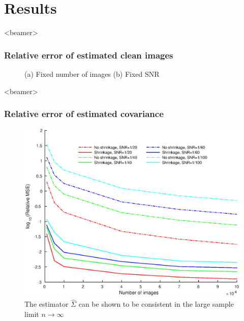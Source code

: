 \documentclass{beamer}
\begin{document}
\section{Results}
\begin{frame}<beamer>
\frametitle{Relative error of estimated clean images}

\begin{figure}[]
\centering
{}
\caption{(a) {Fixed number of images}
(b) {Fixed SNR}
}
\end{figure}
\end{frame}

\begin{frame}<beamer>
\frametitle{Relative error of estimated covariance}
\begin{figure}
\centering
\includegraphics[width=0.6\linewidth]{cwf_shrinkage_compare.eps}
\caption{The estimator $\hat \Sigma$ can be shown to be consistent in the large sample limit
$n \to \infty$}
\label{fig:shrinkage}
\end{figure}
\end{frame}
\end{document}
